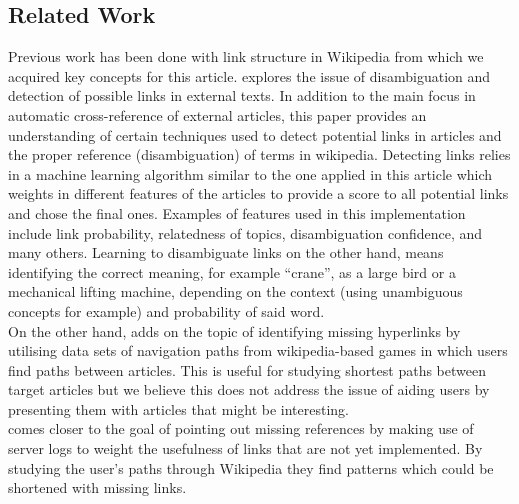 \subsection{Related Work}
Previous work has been done with link structure in Wikipedia from which we acquired key concepts for this article. \cite{learning_link} explores the issue of disambiguation and detection of possible links in external texts. In addition to the main focus in automatic cross-reference of external articles, this paper provides an understanding of certain techniques used to detect potential links in articles and the proper reference (disambiguation) of terms in wikipedia. Detecting links relies in a machine learning algorithm similar to the one applied in this article which weights in different features of the articles to provide a score to all potential links and chose the final ones. Examples of features used in this implementation include link probability, relatedness of topics, disambiguation confidence, and many others.  Learning to disambiguate links on the other hand, means identifying the correct meaning, for example ``crane'', as a large bird or a mechanical lifting machine, depending on the context (using unambiguous concepts for example) and probability of said word. \\
On the other hand, \cite{west} adds on the topic of identifying missing hyperlinks by utilising data sets of navigation paths from wikipedia-based games in which users find paths between articles. This is useful for studying shortest paths between target articles but we believe this does not address the issue of aiding users by presenting them with articles that might be interesting.\\
\cite{paranjape} comes closer to the goal of pointing out missing references by making use of server logs to weight the usefulness of links that are not yet implemented. By studying the user's paths through Wikipedia they find patterns which could be shortened with missing links.